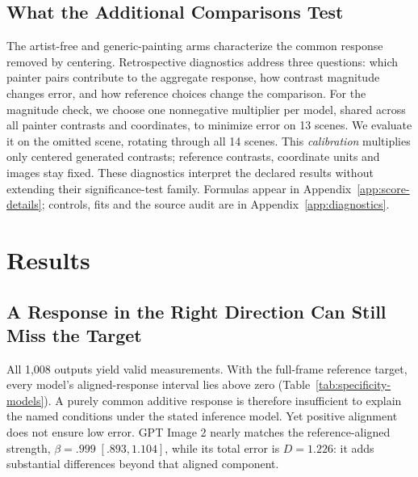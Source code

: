 \subsection{What the Additional Comparisons Test}\label{sec:diagnostics}
The artist-free and generic-painting arms characterize the common response removed
by centering.
Retrospective diagnostics address three questions: which painter pairs contribute
to the aggregate response, how contrast magnitude changes error, and how reference
choices change the comparison. For the magnitude check, we choose one
nonnegative multiplier per model, shared across all painter contrasts and
coordinates, to minimize error on 13 scenes.
We evaluate it on the omitted scene, rotating through all 14 scenes.
This \emph{calibration} multiplies only centered generated contrasts; reference
contrasts, coordinate units and images stay fixed. These diagnostics
interpret the declared results without extending their significance-test family.
Formulas appear in Appendix~\ref{app:score-details}; controls, fits and the source
audit are in Appendix~\ref{app:diagnostics}.

\section{Results}\label{sec:results}
\subsection{A Response in the Right Direction Can Still Miss the Target}
All 1,008 outputs yield valid measurements. With the full-frame
reference target, every model's aligned-response interval lies above zero
(Table~\ref{tab:specificity-models}). A purely common additive response is
therefore insufficient to explain the named conditions under the stated
inference model. Yet positive alignment does not ensure low error. GPT Image 2
nearly matches the reference-aligned strength, $\beta=.999\;[.893,1.104]$,
while its total error is $D=1.226$: it adds substantial differences beyond
that aligned component.

